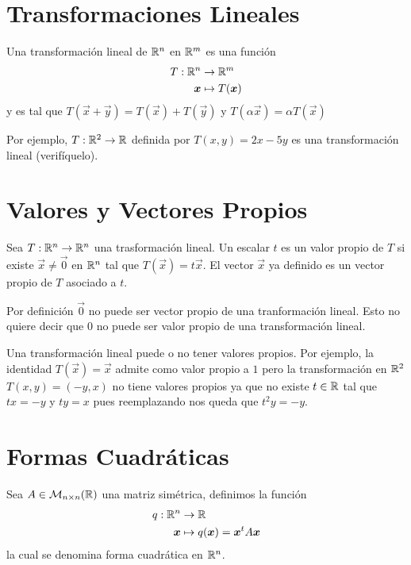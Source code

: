 \section{Transformaciones Lineales}

\begin{definicion}
Una transformaci\'on lineal de $\mathbb{R}^n$ en $\mathbb{R}^m$ es una funci\'on
\begin{align*}
T: \mathbb{R}^n &\to \mathbb{R}^m \\
\boldsymbol{x} &\mapsto T(\boldsymbol{x})
\end{align*}
y es tal que $T(\vec{x}+\vec{y})=T(\vec{x})+T(\vec{y})$ y $T(\alpha \vec{x})=\alpha T(\vec{x})$
\end{definicion}

Por ejemplo, $T:\mathbb{R}^2 \to \mathbb{R}$ definida por $T(x,y)=2x-5y$ es una transformaci\'on lineal (verif\'iquelo).

\section{Valores y Vectores Propios}

\begin{definicion}
Sea $T: \mathbb{R}^n \to \mathbb{R}^n$ una trasformaci\'on lineal. Un escalar $t$ es un valor propio de $T$ si existe $\vec{x}\neq \vec{0}$ en $\mathbb{R}^n$ tal que $T(\vec{x})=t\vec{x}$. El vector $\vec{x}$ ya definido es un vector propio de $T$ asociado a $t$.
\end{definicion}

Por definici\'on $\vec{0}$ no puede ser vector propio de una tranformaci\'on lineal. Esto no quiere decir que $0$ no puede ser valor propio de una transformaci\'on lineal. 

Una transformaci\'on lineal puede o no tener valores propios. Por ejemplo, la identidad $T(\vec{x})=\vec{x}$ admite como valor propio a $1$ pero la transformaci\'on en $\mathbb{R}^2$ $T(x,y)=(-y,x)$ no tiene valores propios ya que no existe $t\in \mathbb{R}$ tal que $tx=-y$ y $ty=x$ pues reemplazando nos queda que $t^2 y = -y$.

\section{Formas Cuadr\'aticas}

\begin{definicion}
Sea $A\in \mathcal{M}_{n\times n} (\mathbb{R})$ una matriz sim\'etrica, definimos la funci\'on
\begin{align*}
q:\mathbb{R}^n &\to \mathbb{R} \\
\boldsymbol{x} &\mapsto q(\boldsymbol{x})=\boldsymbol{x}^tA \boldsymbol{x}
\end{align*}
la cual se denomina forma cuadr\'atica en $\mathbb{R}^n$. 
\end{definicion}

